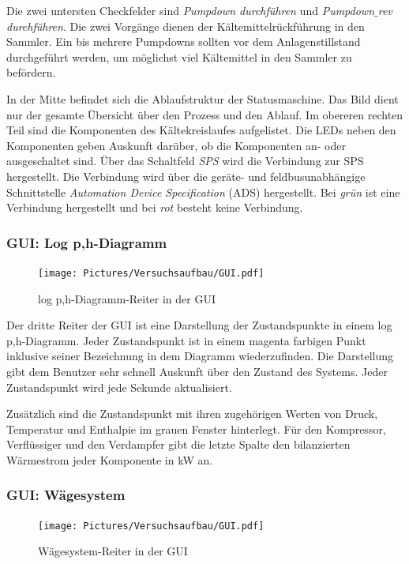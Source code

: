 Die zwei untersten Checkfelder sind \textit{Pumpdown durchführen} und \textit{Pumpdown$\_$rev durchführen}. Die zwei Vorgänge dienen der Kältemittelrückführung in den Sammler. Ein bis mehrere Pumpdowns sollten vor dem Anlagenstillstand durchgeführt werden, um möglichst viel Kältemittel in den Sammler zu befördern. 

In der Mitte befindet sich die Ablaufstruktur der Statusmaschine. Das Bild dient nur der gesamte Übersicht über den Prozess und den Ablauf. Im obereren rechten Teil sind die Komponenten des Kältekreislaufes aufgelistet. Die LEDs neben den Komponenten geben Auskunft darüber, ob die Komponenten an- oder ausgeschaltet sind.   Über das Schaltfeld \textit{SPS} wird die Verbindung zur SPS hergestellt. Die Verbindung wird über die geräte- und feldbusunabhängige Schnittstelle  \textit{Automation Device Specification} (ADS) hergestellt. Bei \textit{grün} ist eine Verbindung hergestellt und bei \textit{rot} besteht keine Verbindung. 



\subsubsection*{GUI: Log p,h-Diagramm}

\begin{figure}[htb]
\centering		\texttt{[image: Pictures/Versuchsaufbau/GUI.pdf]}
\caption{log p,h-Diagramm-Reiter in der GUI}
\label{fig:RI}
\end{figure}

Der dritte Reiter der GUI ist eine Darstellung der Zustandspunkte in einem log p,h-Diagramm. Jeder Zustandspunkt ist in einem magenta farbigen Punkt inklusive seiner Bezeichnung in dem Diagramm wiederzufinden. Die Darstellung gibt dem Benutzer sehr schnell Auskunft über den Zustand des Systems. Jeder Zustandspunkt wird jede Sekunde aktualisiert. 

Zusätzlich sind die Zustandspunkt mit ihren zugehörigen Werten von Druck, Temperatur und Enthalpie im grauen Fenster hinterlegt. Für den Kompressor, Verflüssiger und den Verdampfer gibt die letzte Spalte den bilanzierten Wärmestrom jeder Komponente in kW an. 

\subsubsection*{GUI: Wägesystem}

\begin{figure}[htb]
\centering		\texttt{[image: Pictures/Versuchsaufbau/GUI.pdf]}
\caption{Wägesystem-Reiter in der GUI}
\label{fig:RI}
\end{figure}

